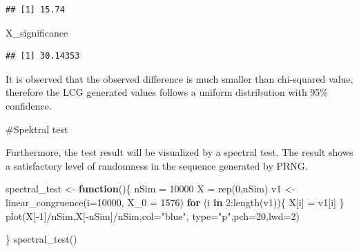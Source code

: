 \documentclass[
]{article}
\newenvironment{Shaded}{\begin{snugshade}}{\end{snugshade}}
\newcommand{\AttributeTok}[1]{\textcolor[rgb]{0.77,0.63,0.00}{#1}}
\newcommand{\ControlFlowTok}[1]{\textcolor[rgb]{0.13,0.29,0.53}{\textbf{#1}}}
\newcommand{\DecValTok}[1]{\textcolor[rgb]{0.00,0.00,0.81}{#1}}
\newcommand{\FunctionTok}[1]{\textcolor[rgb]{0.00,0.00,0.00}{#1}}
\newcommand{\NormalTok}[1]{#1}
\newcommand{\OtherTok}[1]{\textcolor[rgb]{0.56,0.35,0.01}{#1}}
\newcommand{\SpecialCharTok}[1]{\textcolor[rgb]{0.00,0.00,0.00}{#1}}
\newcommand{\StringTok}[1]{\textcolor[rgb]{0.31,0.60,0.02}{#1}}
\begin{document}
\begin{verbatim}
## [1] 15.74
\end{verbatim}

\begin{Shaded}
\begin{Highlighting}[]
\NormalTok{X\_significance}
\end{Highlighting}
\end{Shaded}

\begin{verbatim}
## [1] 30.14353
\end{verbatim}

It is observed that the observed difference is much smaller than
chi-squared value, therefore the LCG generated values follows a uniform
distribution with 95\% confidence.

\#Spektral test

Furthermore, the test result will be visualized by a spectral test. The
result shows a satisfactory level of randomness in the sequence
generated by PRNG.

\begin{Shaded}
\begin{Highlighting}[]
\NormalTok{spectral\_test }\OtherTok{\textless{}{-}} \ControlFlowTok{function}\NormalTok{()\{}
\NormalTok{  nSim }\OtherTok{=} \DecValTok{10000}
\NormalTok{  X }\OtherTok{=} \FunctionTok{rep}\NormalTok{(}\DecValTok{0}\NormalTok{,nSim)}
\NormalTok{  v1 }\OtherTok{\textless{}{-}} \FunctionTok{linear\_congruence}\NormalTok{(}\AttributeTok{i=}\DecValTok{10000}\NormalTok{, }\AttributeTok{X\_0 =} \DecValTok{1576}\NormalTok{)}
  \ControlFlowTok{for}\NormalTok{ (i }\ControlFlowTok{in} \DecValTok{2}\SpecialCharTok{:}\FunctionTok{length}\NormalTok{(v1))\{}
\NormalTok{   X[i] }\OtherTok{=}\NormalTok{ v1[i]}
\NormalTok{  \}}
\FunctionTok{plot}\NormalTok{(X[}\SpecialCharTok{{-}}\DecValTok{1}\NormalTok{]}\SpecialCharTok{/}\NormalTok{nSim,X[}\SpecialCharTok{{-}}\NormalTok{nSim]}\SpecialCharTok{/}\NormalTok{nSim,}\AttributeTok{col=}\StringTok{"blue"}\NormalTok{, }\AttributeTok{type=}\StringTok{"p"}\NormalTok{,}\AttributeTok{pch=}\DecValTok{20}\NormalTok{,}\AttributeTok{lwd=}\DecValTok{2}\NormalTok{)}
    
\NormalTok{\}}
\FunctionTok{spectral\_test}\NormalTok{()}
\end{Highlighting}
\end{Shaded}
\end{document}
